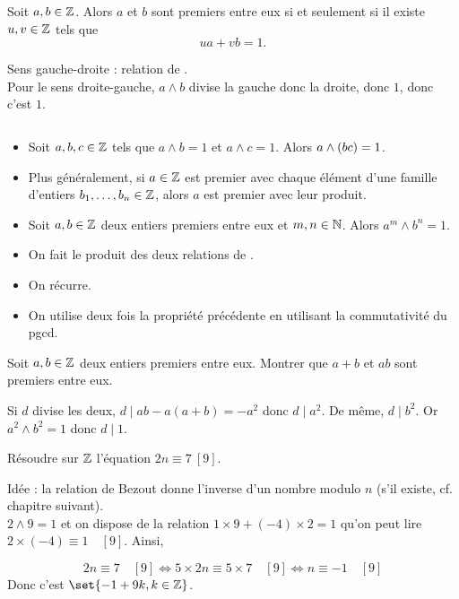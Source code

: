 \documentclass{magnolia}
\begin{document}
\begin{proposition}
Soit $a,b\in\mathbb{Z}$. Alors $a$ et $b$ sont premiers entre eux si et seulement si il
existe $u,v\in\mathbb{Z}$ tels que
\[ua+vb=1.\]
\end{proposition}

\begin{preuve}
Sens gauche-droite : relation de .\\
Pour le sens droite-gauche, $a\wedge b$ divise la gauche donc la droite, donc $1$, donc c'est $1$.
\end{preuve}

\begin{proposition}
$\quad$
\begin{itemize}
\item Soit $a,b,c\in\mathbb{Z}$ tels que $a\wedge b=1$ et $a\wedge c=1$. Alors
  $a\wedge \left(bc\right)=1$.
\item Plus généralement, si $a\in\mathbb{Z}$ est premier avec chaque élément d'une
  famille d'entiers $b_1,\ldots,b_n\in\mathbb{Z}$, alors $a$ est premier avec leur
  produit.
\item Soit $a,b\in\mathbb{Z}$ deux entiers premiers entre eux et $m,n\in\mathbb{N}$. Alors
  $a^m\wedge b^n=1$.
\end{itemize}
\end{proposition}

\begin{preuve}
\begin{itemize}
\item On fait le produit des deux relations de .
\item On récurre.
\item On utilise deux fois la propriété précédente en utilisant la commutativité du pgcd.
\end{itemize}
\end{preuve}

\begin{exos}
\exo Soit $a,b\in\mathbb{Z}$ deux entiers premiers entre eux. Montrer que $a+b$ et
  $ab$ sont premiers entre eux.
  \begin{sol}
  Si $d$ divise les deux, $d\mid ab-a(a+b)=-a^2$ donc $d\mid a^2$. De même, $d\mid b^2$. Or $a^2\wedge b^2=1$ donc $d\mid 1$.
  \end{sol}
\exo Résoudre sur $\mathbb{Z}$ l'équation $2n\equiv 7\ [9]$.
\begin{sol}
Idée : la relation de Bezout donne l'inverse d'un nombre modulo $n$ (s'il existe, cf. chapitre suivant).\\
$2\wedge 9=1$ et on dispose de la relation $1\times 9+(-4)\times 2=1$ qu'on peut lire $2\times (-4)\equiv 1 \quad [9]$. Ainsi,

$$2n\equiv 7\quad [9] \Longleftrightarrow 5\times 2n\equiv 5\times 7\quad [9] \Longleftrightarrow n \equiv -1 \quad [9]$$
Donc c'est $\set{-1+9k, k\in \Z}$.
\end{sol}
\end{exos}
\end{document}
